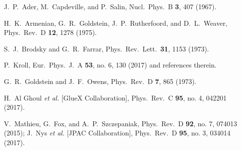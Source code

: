 \documentclass[aps,prc,twocolumn,floatfix,showpacs,preprintnumbers,amsmath,amssymb,superscriptaddress,linenumbers]{revtex4-1}
\begin{document}
\begin{thebibliography}{99}

  J.~P.~Ader, M.~Capdeville, and P.~Salin,
  Nucl.\ Phys.\ B {\bf 3}, 407 (1967).

  H.~K.~Armenian, G.~R.~Goldstein, J.~P.~Rutherfoord, and D.~L.~Weaver,
  Phys.\ Rev.\ D {\bf 12}, 1278 (1975).

  S.~J.~Brodsky and G.~R.~Farrar,
  Phys.\ Rev.\ Lett.\  {\bf 31}, 1153 (1973).

  P.~Kroll,
  Eur.\ Phys.\ J.\ A {\bf 53}, no. 6, 130 (2017) and references therein.

  G.~R.~Goldstein and J.~F.~Owens,
  Phys.\ Rev.\ D {\bf 7}, 865 (1973).

  H.~Al Ghoul {\it et al.} [GlueX Collaboration],
  Phys.\ Rev.\ C {\bf 95}, no. 4, 042201 (2017).

  V.~Mathieu, G.~Fox, and A.~P.~Szczepaniak,
  Phys.\ Rev.\ D {\bf 92}, no. 7, 074013 (2015);
  J.~Nys {\it et al.} [JPAC Collaboration],
  Phys.\ Rev.\ D {\bf 95}, no. 3, 034014 (2017).


\end{thebibliography}
\end{document}
